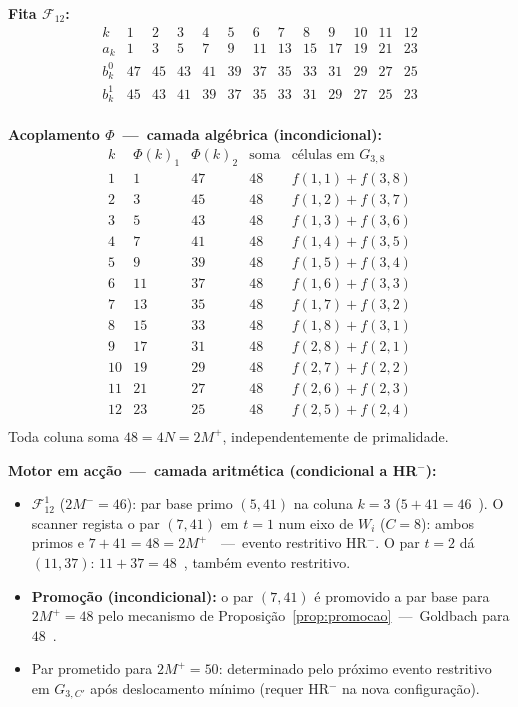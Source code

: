 \documentclass[12pt, a4paper]{article}
\theoremstyle{plain}
\theoremstyle{definition}
\theoremstyle{remark}
\begin{document}
	\medskip\noindent\textbf{Fita $\mathcal{F}_{12}$:}
	\[
	\begin{array}{c|cccccccccccc}
		k & 1&2&3&4&5&6&7&8&9&10&11&12\\
		\hline
		a_k   &1&3&5&7&9&11&13&15&17&19&21&23\\
		b_k^0 &47&45&43&41&39&37&35&33&31&29&27&25\\
		b_k^1 &45&43&41&39&37&35&33&31&29&27&25&23\\
	\end{array}
	\]
	
	\medskip\noindent\textbf{Acoplamento $\Phi$~---~camada algébrica
		(incondicional):}
	\[
	\begin{array}{c|cc|c|c}
		k & \Phi(k)_1 & \Phi(k)_2 & \text{soma} & \text{células em }G_{3,8}\\
		\hline
		1  & 1  & 47 & 48 & f(1,1)+f(3,8)\\
		2  & 3  & 45 & 48 & f(1,2)+f(3,7)\\
		3  & 5  & 43 & 48 & f(1,3)+f(3,6)\\
		4  & 7  & 41 & 48 & f(1,4)+f(3,5)\\
		5  & 9  & 39 & 48 & f(1,5)+f(3,4)\\
		6  & 11 & 37 & 48 & f(1,6)+f(3,3)\\
		7  & 13 & 35 & 48 & f(1,7)+f(3,2)\\
		8  & 15 & 33 & 48 & f(1,8)+f(3,1)\\
		9  & 17 & 31 & 48 & f(2,8)+f(2,1)\\
		10 & 19 & 29 & 48 & f(2,7)+f(2,2)\\
		11 & 21 & 27 & 48 & f(2,6)+f(2,3)\\
		12 & 23 & 25 & 48 & f(2,5)+f(2,4)\\
	\end{array}
	\]
	Toda coluna soma $48=4N=2M^+$, independentemente de primalidade. \checkmark
	
	\medskip\noindent\textbf{Motor em acção~---~camada aritmética
		(condicional a HR$^-$):}
	\begin{itemize}
		\item $\mathcal{F}_{12}^1$ ($2M^-=46$): par base primo $(5,41)$
		na coluna $k=3$ ($5+41=46$~\checkmark).
		O scanner regista o par $(7,41)$ em $t=1$ num eixo de $W_i$
		($C=8$): ambos primos e $7+41=48=2M^+$~\checkmark~---~evento
		restritivo HR$^-$.  O par $t=2$ dá $(11,37)$:
		$11+37=48$~\checkmark, também evento restritivo.
		\item \textbf{Promoção (incondicional):} o par $(7,41)$ é
		promovido a par base para $2M^+=48$ pelo mecanismo de
		Proposição~\ref{prop:promocao}~---~Goldbach para
		$48$~\checkmark.
		\item Par prometido para $2M^+=50$: determinado pelo próximo
		evento restritivo em $G_{3,C'}$ após deslocamento mínimo
		(requer HR$^-$ na nova configuração).
	\end{itemize}
	
\end{document}
